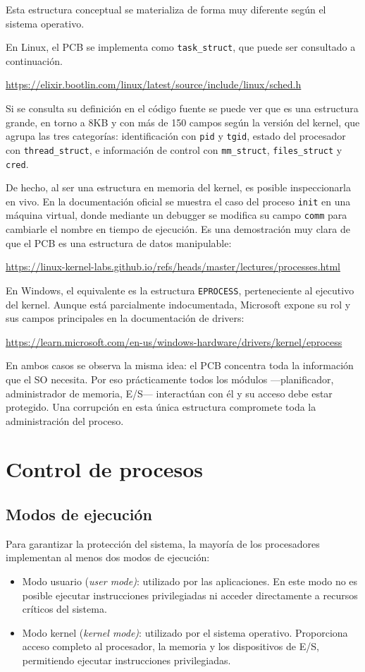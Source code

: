 Esta estructura conceptual se materializa de forma muy diferente según el sistema operativo.

En Linux, el PCB se implementa como \texttt{task\_struct}, que puede ser consultado a continuación.

\url{https://elixir.bootlin.com/linux/latest/source/include/linux/sched.h}

Si se consulta su definición en el código fuente se puede ver que es una estructura grande, en torno a 8KB y con más de 150 campos según la versión del kernel, que agrupa las tres categorías: identificación con \texttt{pid} y \texttt{tgid}, estado del procesador con \texttt{thread\_struct}, e información de control con \texttt{mm\_struct}, \texttt{files\_struct} y \texttt{cred}.

De hecho, al ser una estructura en memoria del kernel, es posible inspeccionarla en vivo. En la documentación oficial se muestra el caso del proceso \texttt{init} en una máquina virtual, donde mediante un debugger se modifica su campo \texttt{comm} para cambiarle el nombre en tiempo de ejecución. Es una demostración muy clara de que el PCB es una estructura de datos manipulable:

\url{https://linux-kernel-labs.github.io/refs/heads/master/lectures/processes.html}

En Windows, el equivalente es la estructura \texttt{EPROCESS}, perteneciente al ejecutivo del kernel. Aunque está parcialmente indocumentada, Microsoft expone su rol y sus campos principales en la documentación de drivers:

\url{https://learn.microsoft.com/en-us/windows-hardware/drivers/kernel/eprocess}

En ambos casos se observa la misma idea: el PCB concentra toda la información que el SO necesita. Por eso prácticamente todos los módulos ---planificador, administrador de memoria, E/S--- interactúan con él y su acceso debe estar protegido. Una corrupción en esta única estructura compromete toda la administración del proceso.

\section{Control de procesos}

\subsection{Modos de ejecución}

Para garantizar la protección del sistema, la mayoría de los procesadores implementan al menos dos modos de ejecución:
\begin{itemize}
  \item Modo usuario (\emph{user mode)}: utilizado por las aplicaciones. En este modo no es posible ejecutar instrucciones privilegiadas ni acceder directamente a recursos críticos del sistema.
  \item Modo kernel (\emph{kernel mode)}: utilizado por el sistema operativo. Proporciona acceso completo al procesador, la memoria y los dispositivos de E/S, permitiendo ejecutar instrucciones privilegiadas.
\end{itemize}

